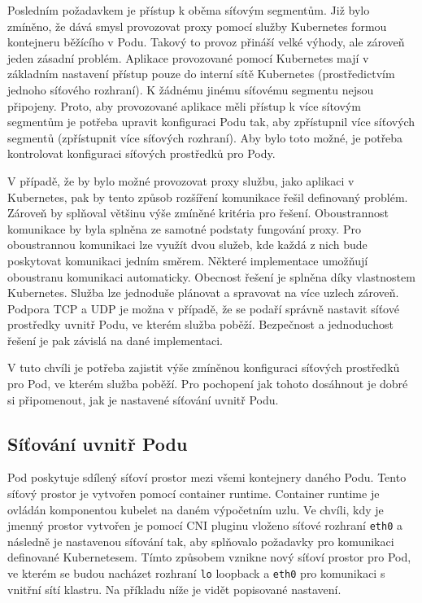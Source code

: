 Posledním požadavkem je přístup k oběma síťovým segmentům. Již bylo zmíněno, že dává smysl provozovat proxy pomocí služby Kubernetes formou kontejneru běžícího v Podu. Takový to provoz přináší velké výhody, ale zároveň jeden zásadní problém. Aplikace provozované pomocí Kubernetes mají v základním nastavení přístup pouze do interní sítě Kubernetes (prostředictvím jednoho síťového rozhraní). K žádnému jinému  síťovému segmentu nejsou připojeny. Proto, aby provozované aplikace měli přístup k více sítovým segmentům je potřeba upravit konfiguraci Podu tak, aby zpřístupnil více síťových segmentů (zpřístupnit více síťových rozhraní). Aby bylo toto možné, je potřeba kontrolovat konfiguraci síťových prostředků pro Pody.

V případě, že by bylo možné provozovat proxy službu, jako aplikaci v Kubernetes, pak by tento způsob rozšíření komunikace řešil definovaný problém. Zároveň by splňoval většinu výše zmíněné kritéria pro řešení. Oboustrannost komunikace by byla splněna ze samotné podstaty fungování proxy. Pro oboustrannou komunikaci lze využít dvou služeb, kde každá z nich bude poskytovat komunikaci jedním směrem. Některé implementace umožňují oboustranu komunikaci automaticky. Obecnost řešení je splněna díky vlastnostem Kubernetes. Služba lze jednoduše plánovat a spravovat na více uzlech zároveň. Podpora TCP a UDP je možna v případě, že se podaří správně nastavit síťové prostředky uvnitř Podu, ve kterém služba poběží. Bezpečnost a jednoduchost řešení je pak závislá na dané implementaci.

V tuto chvíli je potřeba zajistit výše zmíněnou konfiguraci síťových prostředků pro Pod, ve kterém služba poběží. Pro pochopení jak tohoto dosáhnout je dobré si připomenout, jak je nastavené síťování uvnitř Podu.

\subsection{Síťování uvnitř Podu}
Pod poskytuje sdílený síťoví prostor mezi všemi kontejnery daného Podu. Tento síťový prostor je vytvořen pomocí container runtime. Container runtime je ovládán komponentou kubelet na daném výpočetním uzlu. Ve chvíli, kdy je jmenný prostor vytvořen je pomocí CNI pluginu vloženo síťové rozhraní \verb|eth0| a následně je nastavenou síťování tak, aby splňovalo požadavky pro komunikaci definované Kubernetesem. Tímto způsobem vznikne nový síťoví prostor pro Pod, ve kterém se budou nacházet rozhraní \verb|lo| loopback a \verb|eth0| pro komunikaci s vnitřní sítí klastru. Na příkladu níže je vidět popisované nastavení.

